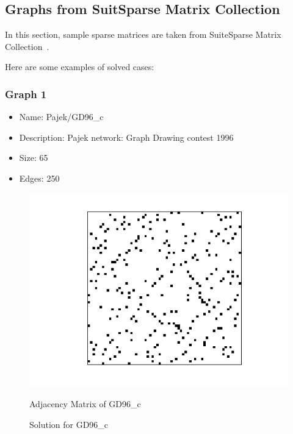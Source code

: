 \documentclass[a4paper,12pt]{report}
\begin{document}
\subsection{Graphs from SuitSparse Matrix Collection}

In this section, sample sparse matrices are taken from SuiteSparse Matrix Collection~\cite{sparse-collection}. 

Here are some examples of solved cases:

\subsubsection{Graph 1}

\begin{itemize}
	\item Name: Pajek/GD96\_c
	\item Description: Pajek network: Graph Drawing contest 1996
	\item Size: 65
	\item Edges: 250
\end{itemize}


\begin{figure}[H]
    \centering
    \begin{minipage}{.5\textwidth}
        \centering
	\includegraphics[width=.9\linewidth]{GD96_c-adjacency}
        \caption{Adjacency Matrix of GD96\_c}
        \label{fig:adjacency-1}
    \end{minipage}%
    \begin{minipage}{0.5\textwidth}
        \centering
	
        \caption{Solution for GD96\_c}
        \label{fig:sol1}
    \end{minipage}
\end{figure} 
\end{document}
